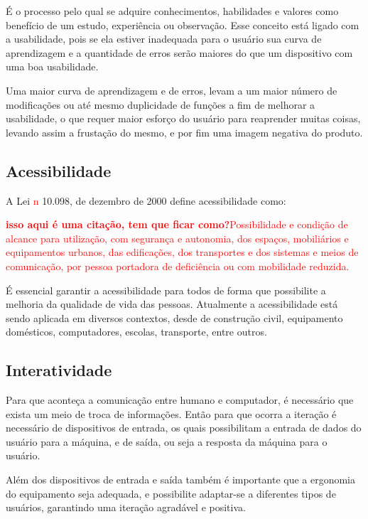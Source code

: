 \documentclass[
	12pt,			%
	openright,		%
	oneside,			%
	a4paper,			%
	chapter=TITLE,		%
	english,			%
	brazil,			%
	]{abntex2}
\begin{document}
É o processo pelo qual se adquire conhecimentos, habilidades e valores como benefício de um estudo, experiência ou observação. Esse conceito está ligado com a usabilidade, pois se ela estiver inadequada para o usuário sua curva de aprendizagem e a quantidade de erros serão maiores do que um dispositivo com uma boa usabilidade.

Uma maior curva de aprendizagem e de erros, levam a um maior número de modificações ou até mesmo duplicidade de funções a fim de melhorar a usabilidade, o que requer maior esforço do usuário para reaprender muitas coisas, levando assim a frustação do mesmo, e por fim uma imagem negativa do produto.

\subsection{Acessibilidade}

A Lei \textcolor{red}{n} 10.098, de dezembro de 2000 define acessibilidade como:

\textcolor{red}{\textbf{isso aqui é uma citação, tem que ficar como?}Possibilidade e condição de alcance para utilização, com segurança e autonomia, dos espaços, mobiliários e equipamentos urbanos, das edificações, dos transportes e dos sistemas e meios de comunicação, por pessoa portadora de deficiência ou com mobilidade reduzida.}

É essencial garantir a acessibilidade para todos de forma que possibilite a melhoria da qualidade de vida das pessoas. Atualmente a acessibilidade está sendo aplicada em diversos contextos, desde de construção civil, equipamento domésticos, computadores, escolas, transporte, entre outros.

\subsection{Interatividade}

Para que aconteça a comunicação entre humano e computador, é necessário que exista um meio de troca de informações. Então para que ocorra a iteração é necessário de dispositivos de entrada, os quais possibilitam a entrada de dados do usuário para a máquina, e de saída, ou seja a resposta da máquina para o usuário.

Além dos dispositivos de entrada e saída também é importante que a ergonomia do equipamento seja adequada, e possibilite adaptar-se a diferentes tipos de usuários, garantindo uma iteração agradável e positiva.
\end{document}
